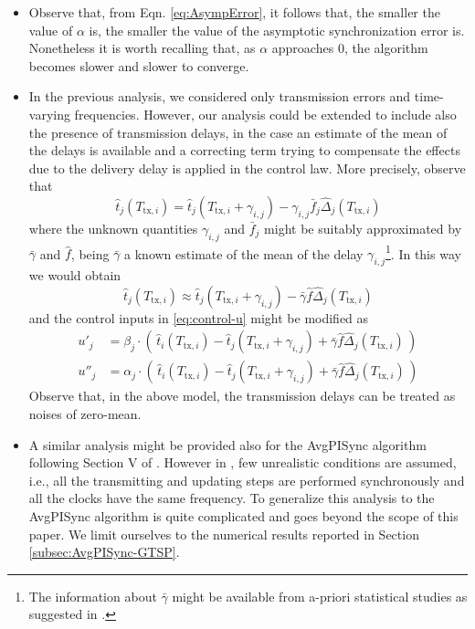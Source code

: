 \documentclass[english,a4paper,10pt,final]{article}
\numberwithin{equation}{section}
\numberwithin{figure}{section}
\begin{document}
\begin{itemize}
\item Observe that, from Eqn. \eqref{eq:AsympError}, it follows that, the smaller the value of $\alpha$ is, the smaller the value of the asymptotic synchronization error is. Nonetheless it is worth recalling that, as $\alpha$ approaches $0$, the algorithm becomes slower and slower to converge. 

\item In the previous analysis, we considered only transmission errors and time-varying frequencies. 
However, our analysis could be extended to include also the presence of transmission delays, in the case an estimate of  the mean of the delays is available and a correcting term trying to compensate the effects due to the delivery delay is applied in the control law. More precisely, observe that
$$
\hat{t}_j(T_{\mathrm{tx},i})= \hat{t}_j(T_{\mathrm{tx},i}+\gamma_{i,j})- \gamma_{i,j} \bar{f}_j\hat{\Delta}_j(T_{\mathrm{tx},i})
$$
where the unknown quantities $\gamma_{i,j}$ and $\bar{f}_j$ might be suitably approximated by $\bar{\gamma}$ and $\hat{f}$, being $\bar{\gamma}$ a known estimate of the mean of the delay $\gamma_{i,j}$\footnote{The information about $\bar{\gamma}$
 might be available from a-priori statistical studies as suggested in \cite{ZZ-PPC-TH:09}.}. In this way we would obtain
$$
\hat{t}_j(T_{\mathrm{tx},i}) \approx \hat{t}_j(T_{\mathrm{tx},i}+\gamma_{i,j})- \bar{\gamma} \hat{f}\hat{\Delta}_j(T_{\mathrm{tx},i})
$$
and the control inputs in \eqref{eq:control-u} might be modified as
\begin{align}\label{eq:control-u-modified}
u'_j &=   \beta_j \cdot \left(\, \hat{t}_i(T_{\mathrm{tx},i})-\hat{t}_j \left(T_{\mathrm{tx},i}+\gamma_{i,j}\right)+ \bar{\gamma} \hat{f}\hat{\Delta}_j(T_{\mathrm{tx},i})\,\right)\nonumber\\
u''_j &=   \alpha_j \cdot \left(\, \hat{t}_i(T_{\mathrm{tx},i})-\hat{t}_j \left(T_{\mathrm{tx},i}+\gamma_{i,j}\right)+ \bar{\gamma} \hat{f}\hat{\Delta}_j(T_{\mathrm{tx},i})\,\right)
\end{align}
Observe that, in the above model, the transmission delays can be treated as noises of zero-mean.
\item  A similar analysis might be provided also for the AvgPISync algorithm following Section V of \cite{Carli_2011}. However in \cite{Carli_2011}, few unrealistic conditions are assumed, i.e., all the transmitting and updating steps are performed synchronously and all the clocks have the same frequency. To generalize this analysis to the AvgPISync algorithm is quite complicated and goes beyond the scope of this paper. We limit ourselves to the numerical results reported in Section \ref{subsec:AvgPISync-GTSP}.
\end{itemize}
\end{document}
